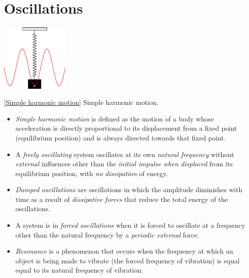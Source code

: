 \documentclass[oneside]{book}
\begin{document}
\chapter{Oscillations}
\begin{center}
    \includegraphics[width=0.25\textwidth,page=20]{../images/SHM/SHMCropped.pdf}
    \captionsetup{type=figure}
    \caption[figure]{\ref{Simple harmonic motion} Simple harmonic motion.}
\end{center}
\begin{itemize}
    \item \textit{Simple harmonic motion} is defined as the motion of a body whose acceleration is directly proportional to its displacement from a fixed point (equilibrium position) and is always directed towards that fixed point.
    \item A \textit{freely oscillating} system oscillates at its own \textit{natural frequency} without \emph{external} influences other than the \emph{initial impulse when displaced} from its equilibrium position, with \emph{no dissipation} of energy.
    \item \textit{Damped oscillations} are oscillations in which the amplitude diminishes with time as a result of \emph{dissipative forces} that reduce the total energy of the oscillations.
    \item A system is in \textit{forced oscillations} when it is forced to oscillate at a frequency other than the natural frequency by a \emph{periodic external} force.
    \item \textit{Resonance} is a phenomenon that occurs when the frequency at which an object is being made to vibrate (the forced frequency of vibration) is equal equal to its natural frequency of vibration.
\end{itemize}
\end{document}
